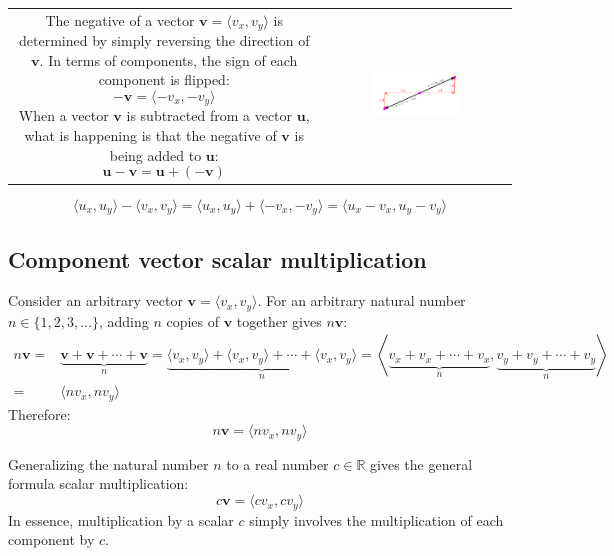 \documentclass{article}
\begin{document}
\begin{tabular}{cc}
\parbox{0.5\textwidth}{
The negative of a vector \(\mathbf{v} = \langle v_x, v_y \rangle\) is determined by simply reversing the direction of \(\mathbf{v}\). In terms of components, the sign of each component is flipped:
\[-\mathbf{v} = \langle -v_x, -v_y \rangle\]
When a vector \(\mathbf{v}\) is subtracted from a vector \(\mathbf{u}\), what is happening is that the negative of \(\mathbf{v}\) is being added to \(\mathbf{u}\): 
\[\mathbf{u} - \mathbf{v} = \mathbf{u} + (-\mathbf{v})\]
} & \parbox{0.5\textwidth}{
\includegraphics[width = 0.5\textwidth]{component_vector_negative}
}
\end{tabular}
\[\langle u_x, u_y \rangle - \langle v_x, v_y \rangle = \langle u_x, u_y \rangle + \langle -v_x, -v_y \rangle = \langle u_x - v_x, u_y - v_y \rangle\]


\subsection*{Component vector scalar multiplication}

Consider an arbitrary vector \(\mathbf{v} = \langle v_x, v_y \rangle\). For an arbitrary natural number \(n \in \{1, 2, 3, ...\}\), adding \(n\) copies of \(\mathbf{v}\) together gives \(n\mathbf{v}\):
\begin{align*}
n\mathbf{v} = & \underbrace{\mathbf{v} + \mathbf{v} + \cdots + \mathbf{v}}_n 
= \underbrace{\langle v_x, v_y \rangle + \langle v_x, v_y \rangle + \cdots + \langle v_x, v_y \rangle}_n 
= \left\langle \underbrace{v_x + v_x + \cdots + v_x}_n, \underbrace{v_y + v_y + \cdots + v_y}_n \right\rangle \\  
= & \langle n v_x, n v_y \rangle
\end{align*}
Therefore:
\[n\mathbf{v} = \langle n v_x, n v_y \rangle\]

Generalizing the natural number \(n\) to a real number \(c \in \mathbb{R}\) gives the general formula scalar multiplication:
\[c\mathbf{v} = \langle c v_x, c v_y \rangle\]
In essence, multiplication by a scalar \(c\) simply involves the multiplication of each component by \(c\). \\
\end{document}
